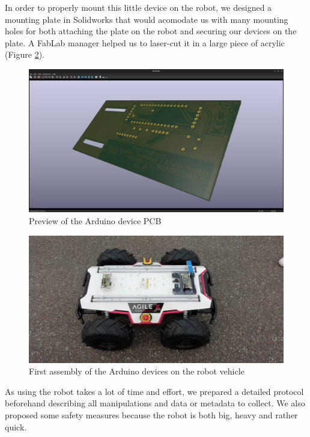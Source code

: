 In order to properly mount this little device on the robot, we designed a mounting plate in Solidworks that would acomodate us with many mounting holes for both attaching the plate on the robot and securing our devices on the plate. A FabLab manager helped us to laser-cut it in a large piece of acrylic (Figure \ref{robot_1}).\\

\begin{figure}
    \center
    \includegraphics[scale=.12]{img/pcb_preview.png}
    \caption{Preview of the Arduino device PCB}
    \label{pcb_preview}
\end{figure}

\begin{figure}
    \center
    \includegraphics[scale=.15]{img/robot_1.png}
    \caption{First assembly of the Arduino devices on the robot vehicle}
    \label{robot_1}
\end{figure}

As using the robot takes a lot of time and effort, we prepared a detailed protocol beforehand describing all manipulations and data or metadata to collect. We also proposed some safety measures because the robot is both big, heavy and rather quick.\\

